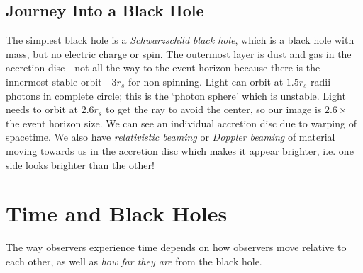\documentclass[a4paper, 11pt, normalem]{report}
\begin{document}
\section{Journey Into a Black Hole}
The simplest black hole is a \emph{Schwarzschild black hole}, which is a black hole with mass, but no electric charge or spin. 
The outermost layer is dust and gas in the accretion disc - not all the way to the event horizon because there is the innermost stable orbit - $3r_s$ for non-spinning. 
Light can orbit at $1.5r_s$ radii - photons in complete circle; this is the `photon sphere' which is unstable. 
Light needs to orbit at $2.6r_s$ to get the ray to avoid the center, so our image is $2.6\times$ the event horizon size. 
We can see an individual accretion disc due to warping of spacetime.
We also have \emph{relativistic beaming} or \emph{Doppler beaming} of material moving towards us in the accretion disc which makes it appear brighter, i.e. one side looks brighter than the other!

\chapter{Time and Black Holes}
The way observers experience time depends on how observers move relative to each other, as well as \emph{how far they are} from the black hole.
\end{document}
